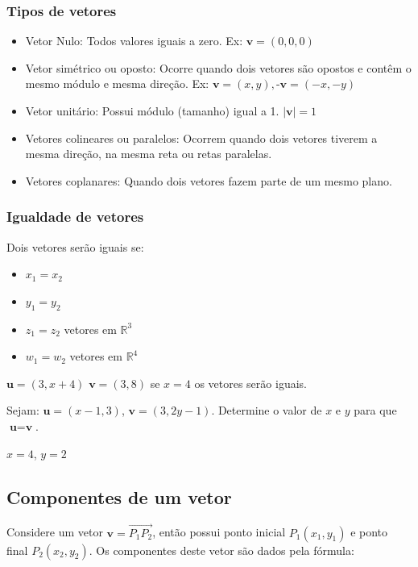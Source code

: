 \documentclass[12pt]{article}
\begin{document}
\subsubsection{Tipos de vetores}

\singlespacing
\begin{itemize}
	\item Vetor Nulo: Todos valores iguais a zero. Ex: \(\textbf{v} = (0,0,0)\)
	\item Vetor simétrico ou oposto: Ocorre quando dois vetores são opostos e contêm o mesmo módulo e mesma direção. Ex: \(\textbf{v} = (x,y), \textbf{-v} = (-x,-y)\)
	\item Vetor unitário: Possui módulo (tamanho) igual a 1. \(|\textbf{v}| = 1\)
	\item Vetores colineares ou paralelos: Ocorrem quando dois vetores tiverem a mesma direção, na mesma reta ou retas paralelas.
	\item Vetores coplanares: Quando dois vetores fazem parte de um mesmo plano.
\end{itemize}
\onehalfspacing
\pagebreak

\subsubsection{Igualdade de vetores}

Dois vetores serão iguais se: 

\singlespacing
\begin{itemize}
	\item \(x_{1} = x_{2}\)
	\item \(y_{1} = y_{2}\)
	\item \(z_{1} = z_{2}\) vetores em \(\mathbb{R}^3\)
	\item \(w_{1} = w_{2}\) vetores em \(\mathbb{R}^4\)
\end{itemize}
\onehalfspacing

\(\textbf{u} = (3, x + 4)\) \(\textbf{v} = (3, 8)\) se \(x = 4\) os vetores serão iguais.

Sejam: \(\textbf{u} = (x-1, 3)\), \(\textbf{v} = (3, 2y-1)\). Determine o valor de \(x\) e \(y\) para que \(\textbf{u} = \textbf{v}\).

\(x = 4\), \(y = 2\)

\subsection{Componentes de um vetor}

Considere um vetor \(\textbf{v} = \overrightarrow{P_{1}P_{2}}\), então possui ponto inicial \(P_{1}(x_{1}, y_{1})\) e ponto final \(P_{2}(x_{2}, y_{2})\). Os componentes deste vetor são dados pela fórmula\cite{anton2012algebra}: 
\end{document}
